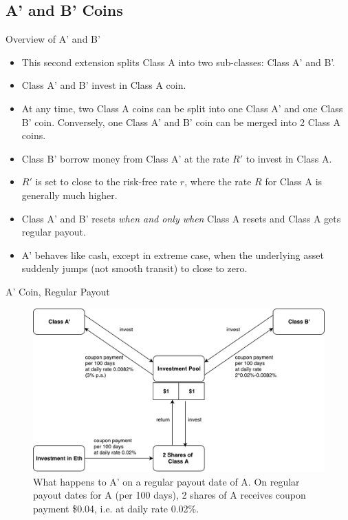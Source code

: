 \documentclass[notes=show, beamer, handout]{beamer}
\begin{document}
\subsection{A' and B' Coins}


\begin{frame}{Overview of A' and B'}

\begin{itemize}
\item This second extension splits Class A into two sub-classes: Class A' and B'.
\item Class A' and B' invest in Class A coin.
\item At any time, two Class A coins can be split into one Class A' and one Class B' coin. Conversely, one Class A' and B' coin can be merged into 2 Class A coins.
\item Class B' borrow money from Class A' at the rate $R'$ to invest in Class A. 
\item $R'$ is set to close to the risk-free rate $r$, where the rate $R$ for Class A is generally much higher.
\item Class A' and B' resets {\it when and only when} Class A resets and Class A gets regular payout.
\item A' behaves like cash, except in extreme case, when the underlying asset suddenly jumps (not smooth transit) to close to zero.
\end{itemize}

\end{frame}


\begin{frame}{A' Coin, Regular Payout}

\begin{figure}
\includegraphics[width=\textwidth]{Ap_periodic.pdf}
\caption{\footnotesize What happens to A' on a regular payout date of A. On regular payout dates for A  (per 100 days), 2 shares of  A receives coupon payment \$0.04, i.e. at daily rate 0.02\%.}
\end{figure}

\end{frame}
\end{document}
